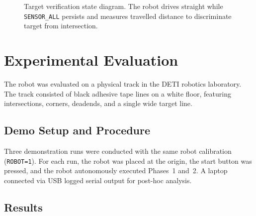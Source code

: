 \documentclass[runningheads]{llncs}
\begin{document}
\begin{figure}[t]
\centering
{}
\caption{Target verification state diagram. The robot drives straight while \texttt{SENSOR\_ALL} persists and measures travelled distance to discriminate target from intersection.}
\label{fig:target-verify}
\end{figure}

\section{Experimental Evaluation}\label{sec:experiments}

The robot was evaluated on a physical track in the DETI robotics laboratory. The track consisted of black adhesive tape lines on a white floor, featuring intersections, corners, deadends, and a single wide target line.

\subsection{Demo Setup and Procedure}

Three demonstration runs were conducted with the same robot calibration (\texttt{ROBOT=1}). For each run, the robot was placed at the origin, the start button was pressed, and the robot autonomously executed Phases~1 and~2. A laptop connected via USB logged serial output for post-hoc analysis.

\subsection{Results}
\end{document}
